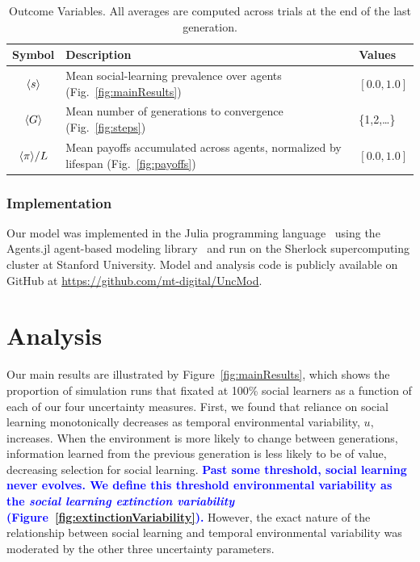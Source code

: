 \documentclass[letterpaper,11.5pt]{scrartcl}
\newcommand{\edit}[1]{{\bfseries \textcolor{blue} {#1}}}
\begin{document}
\begin{table}[h]
    \caption{Outcome Variables. All averages are computed across trials at the end of the last generation.}
    \label{tab:outcomeVariables}
    \centering %
    \begin{tabular}{clp{0.85in}} \toprule

        Symbol & Description & Values \\ 

        \midrule  

        $\langle s \rangle$ & Mean social-learning prevalence over agents (Fig.~\ref{fig:mainResults})
                  & $ [0.0, 1.0]$ \\

        $\langle G \rangle$ & Mean number of generations to convergence (Fig.~\ref{fig:steps}) & \{1,2,\ldots\} \\

        $\langle \pi \rangle / L$ & Mean payoffs accumulated across agents, normalized by
        lifespan (Fig.~\ref{fig:payoffs}) & $ [0.0, 1.0]$ \\

        \bottomrule
    \end{tabular}
\end{table}





\subsubsection{Implementation}

Our model was implemented in the Julia programming language~\citep{Bezanson2017} 
using the Agents.jl agent-based modeling library~\citep{Datseris2022} and run
on the Sherlock supercomputing cluster at Stanford University. Model and analysis code is publicly available on GitHub at \url{https://github.com/mt-digital/UncMod}.


\section{Analysis}

Our main results are illustrated by Figure~\ref{fig:mainResults}, which shows the
proportion of simulation runs that fixated at 100\% social learners as a function of
each of our four uncertainty measures. First, we found that reliance on social
learning monotonically decreases as temporal environmental variability, $u$,
increases. When the environment is more likely to change between generations,
information learned from the previous generation is less likely to be of value,
decreasing selection for social learning. \edit{Past some threshold, social learning never evolves.  We define this threshold environmental variability as the \emph{social learning extinction variability} (Figure~\ref{fig:extinctionVariability}).} 
However, the exact nature of the relationship between social
learning and temporal environmental variability was moderated by the other three uncertainty parameters. 
\end{document}
